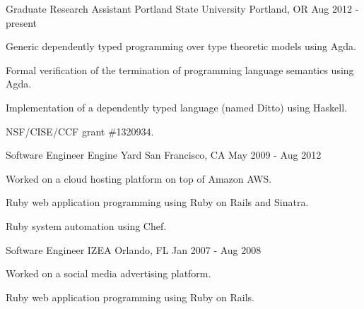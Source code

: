 

\begin{cventries}

  \cventry
    {Graduate Research Assistant} %
    {Portland State University} %
    {Portland, OR} %
    {Aug 2012 - present} %
    {
      \begin{cvitems} %
        \item {Generic dependently typed programming over type theoretic models using Agda.}
        \item {Formal verification of the termination of programming language semantics using Agda.}
        \item {Implementation of a dependently typed language (named Ditto) using Haskell.}
        \item {NSF/CISE/CCF grant \#1320934.}
      \end{cvitems}
    }

  \cventry
    {Software Engineer} %
    {Engine Yard} %
    {San Francisco, CA} %
    {May 2009 - Aug 2012} %
    {
      \begin{cvitems} %
        \item {Worked on a cloud hosting platform on top of Amazon AWS.}
        \item {Ruby web application programming using Ruby on Rails and Sinatra.}
        \item {Ruby system automation using Chef.}
      \end{cvitems}
    }

  \cventry
    {Software Engineer} %
    {IZEA} %
    {Orlando, FL} %
    {Jan 2007 - Aug 2008} %
    {
      \begin{cvitems} %
        \item {Worked on a social media advertising platform.}
        \item {Ruby web application programming using Ruby on Rails.}
      \end{cvitems}
    }


\end{cventries}
